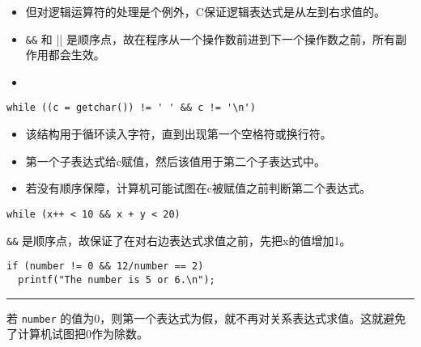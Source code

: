 \begin{frame}[fragile]
\begin{itemize}
\item 但对逻辑运算符的处理是个例外，C保证逻辑表达式是从左到右求值的。\\[0.2in]
\item 
\lstinline|&&| 和 \lstinline|||| 是顺序点，故在程序从一个操作数前进到下一个操作数之前，所有副作用都会生效。\\[0.2in]
\item 
{}
\end{itemize}

\end{frame}


\begin{frame}[fragile]
\begin{lstlisting}
while ((c = getchar()) != ' ' && c != '\n') 
\end{lstlisting} 

\pause \vspace{0.5mm}

\begin{itemize}
\item
该结构用于循环读入字符，直到出现第一个空格符或换行符。
\item 
第一个子表达式给c赋值，然后该值用于第二个子表达式中。
\item
若没有顺序保障，计算机可能试图在c被赋值之前判断第二个表达式。
\end{itemize}
\end{frame}



\begin{frame}[fragile]
\begin{lstlisting}
while (x++ < 10 && x + y < 20) 
\end{lstlisting} 


\pause \vspace{0.5mm}

\lstinline|&&| 是顺序点，故保证了在对右边表达式求值之前，先把x的值增加1。
\end{frame}


\begin{frame}[fragile]
\begin{lstlisting}
if (number != 0 && 12/number == 2)
  printf("The number is 5 or 6.\n");
\end{lstlisting} 

\rule{\textwidth}{.5mm} \pause \vspace{0.5mm}

若 \lstinline|number| 的值为0，则第一个表达式为假，就不再对关系表达式求值。这就避免了计算机试图把0作为除数。
\end{frame}

